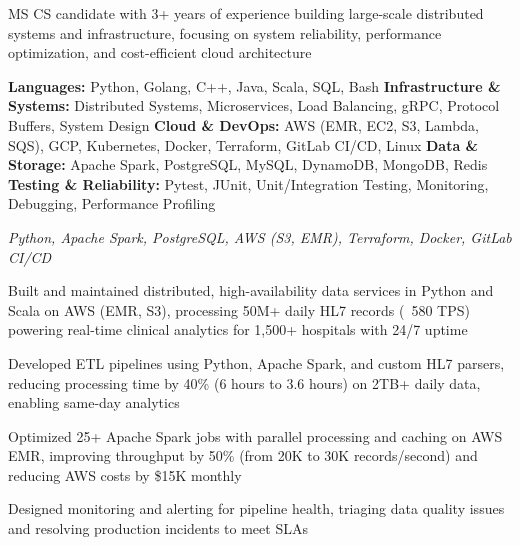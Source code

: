 MS CS candidate with 3+ years of experience building large-scale distributed systems and infrastructure, focusing on system reliability, performance optimization, and cost-efficient cloud architecture

\textbf{Languages:} Python, Golang, C++, Java, Scala, SQL, Bash
\textbf{Infrastructure \& Systems:} Distributed Systems, Microservices, Load Balancing, gRPC, Protocol Buffers, System Design
\textbf{Cloud \& DevOps:} AWS (EMR, EC2, S3, Lambda, SQS), GCP, Kubernetes, Docker, Terraform, GitLab CI/CD, Linux
\textbf{Data \& Storage:} Apache Spark, PostgreSQL, MySQL, DynamoDB, MongoDB, Redis
\textbf{Testing \& Reliability:} Pytest, JUnit, Unit/Integration Testing, Monitoring, Debugging, Performance Profiling

\textit{Python, Apache Spark, PostgreSQL, AWS (S3, EMR), Terraform, Docker, GitLab CI/CD}
\begin{highlights}
    \item Built and maintained distributed, high-availability data services in Python and Scala on AWS (EMR, S3), processing 50M+ daily HL7 records (~580 TPS) powering real-time clinical analytics for 1,500+ hospitals with 24/7 uptime
    \item Developed ETL pipelines using Python, Apache Spark, and custom HL7 parsers, reducing processing time by 40\% (6 hours to 3.6 hours) on 2TB+ daily data, enabling same-day analytics
    \item Optimized 25+ Apache Spark jobs with parallel processing and caching on AWS EMR, improving throughput by 50\% (from 20K to 30K records/second) and reducing AWS costs by \$15K monthly
    \item Designed monitoring and alerting for pipeline health, triaging data quality issues and resolving production incidents to meet SLAs
\end{highlights}
